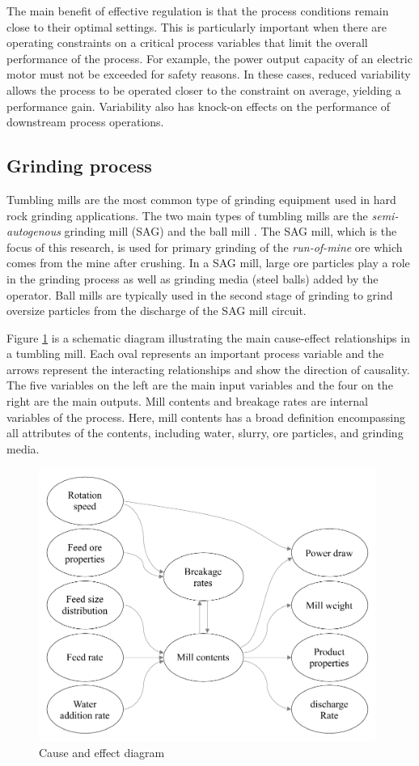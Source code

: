 The main benefit of effective regulation is that the process conditions remain close to their optimal settings. This is particularly important when there are operating constraints on a critical process variables that limit the overall performance of the process. For example, the power output capacity of an electric motor must not be exceeded for safety reasons. In these cases, reduced variability allows the process to be operated closer to the constraint on average, yielding a performance gain. Variability also has knock-on effects on the performance of downstream process operations.

\subsection*{Grinding process}

Tumbling mills are the most common type of grinding equipment used in hard rock grinding applications. The two main types of tumbling mills are the \textit{semi-autogenous} grinding mill (SAG) and the ball mill \citep{king_chapter_2012}. The SAG mill, which is the focus of this research, is used for primary grinding of the \textit{run-of-mine} ore which comes from the mine after crushing. In a SAG mill, large ore particles play a role in the grinding process as well as grinding media (steel balls) added by the operator. Ball mills are typically used in the second stage of grinding to grind oversize particles from the discharge of the SAG mill circuit.

Figure \ref{fig:cause-effect} is a schematic diagram illustrating the main cause-effect relationships in a tumbling mill. Each oval represents an important process variable and the arrows represent the interacting relationships and show the direction of causality. The five variables on the left are the main input variables and the four on the right are the main outputs. Mill contents and breakage rates are internal variables of the process. Here, mill contents has a broad definition encompassing all attributes of the contents, including water, slurry, ore particles, and grinding media.

\begin{figure}[htp]
	\centering
	\includegraphics[width=11cm]{images/cause-effect.pdf}
	\caption{Cause and effect diagram} \label{fig:cause-effect}
\end{figure}

